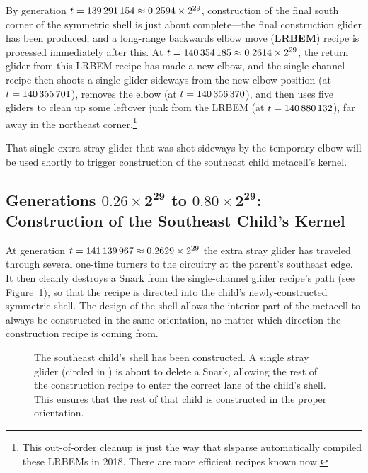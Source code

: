 By generation $t = 139{\,}291{\,}154 \approx 0.2594 \times 2^{29}$, construction of the final south corner of the symmetric shell is just about complete---the final construction glider has been produced, and a long-range backwards elbow move (\textbf{LRBEM}) recipe is processed immediately after this. At $t = 140{\,}354{\,}185 \approx 0.2614 \times 2^{29}$, the return glider from this LRBEM recipe has made a new elbow, and the single-channel recipe then shoots a single glider sideways from the new elbow position (at $t = 140{\,}355{\,}701$), removes the elbow (at $t = 140{\,}356{\,}370$), and then uses five gliders to clean up some leftover junk from the LRBEM (at $t = 140{\,}880{\,}132$), far away in the northeast corner.\footnote{This out-of-order cleanup is just the way that slsparse automatically compiled these LRBEMs in 2018. There are more efficient recipes known now.}

That single extra stray glider that was shot sideways by the temporary elbow will be used shortly to trigger construction of the southeast child metacell's kernel.


\subsection{Generations $\mathbf{0.26 \times 2^{29}}$ to $\mathbf{0.80 \times 2^{29}}$: Construction of the Southeast Child's Kernel}\label{sec:0e0p_timeline_kernel}

At generation $t = 141{\,}139{\,}967 \approx 0.2629 \times 2^{29}$ the extra stray glider has traveled through several one-time turners to the circuitry at the parent's southeast edge. It then cleanly destroys a Snark from the single-channel glider recipe's path (see Figure~\ref{fig:0e0p_timeline_141139967}), so that the recipe is directed into the child's newly-constructed symmetric shell. The design of the shell allows the interior part of the metacell to always be constructed in the same orientation, no matter which direction the construction recipe is coming from.

\begin{figure}[!htb]
	\centering
	\caption{The southeast child's shell has been constructed. A single stray glider (circled in ) is about to delete a Snark, allowing the rest of the construction recipe to enter the correct lane of the child's shell. This ensures that the rest of that child is constructed in the proper orientation.}
	\label{fig:0e0p_timeline_141139967}
\end{figure}

